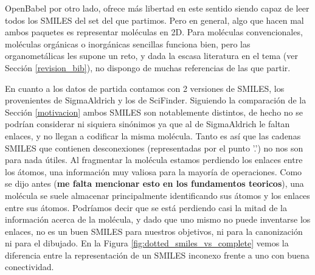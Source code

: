 OpenBabel por otro lado, ofrece más libertad en este sentido siendo capaz de leer todos los SMILES del set del que partimos. Pero en general, algo que hacen mal ambos paquetes es representar moléculas en 2D. Para moléculas convencionales, moléculas orgánicas o inorgánicas sencillas funciona bien, pero las organometálicas les supone un reto, y dada la escasa literatura en el tema (ver Sección \ref{revision_bib}), no dispongo de muchas referencias de las que partir.


En cuanto a los datos de partida contamos con 2 versiones de SMILES, los provenientes de SigmaAldrich y los de SciFinder. Siguiendo la comparación de la Sección \ref{motivacion} ambos SMILES son notablemente distintos, de hecho no se podrían considerar ni siquiera sinónimos ya que al de SigmaAldrich le faltan enlaces, y no llegan a codificar la misma molécula. Tanto es así que las cadenas SMILES que contienen desconexiones (representadas por el punto '.') no nos son para nada útiles. Al fragmentar la molécula estamos perdiendo los enlaces entre los átomos, una información muy valiosa para la mayoría de operaciones. Como se dijo antes (\textbf{me falta mencionar esto en los fundamentos teoricos}), una molécula se suele almacenar principalmente identificando sus átomos y los enlaces entre sus átomos. Podríamos decir que se está perdiendo casi la mitad de la información acerca de la molécula, y dado que uno mismo no puede inventarse los enlaces, no es un buen SMILES para nuestros objetivos, ni para la canonización ni para el dibujado. En la Figura \ref{fig:dotted_smiles_vs_complete} vemos la diferencia entre la representación de un SMILES inconexo frente a uno con buena conectividad.


